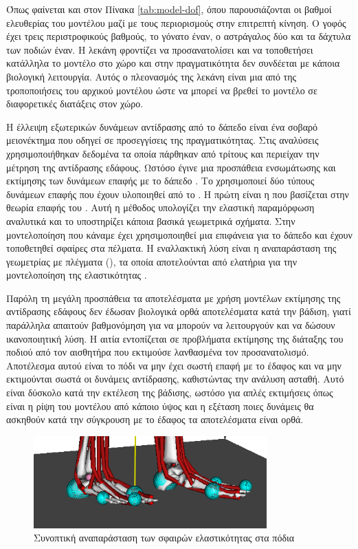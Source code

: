Όπως φαίνεται και στον Πίνακα \ref{tab:model-dof}, όπου παρουσιάζονται οι βαθμοί ελευθερίας του μοντέλου μαζί με τους περιορισμούς στην επιτρεπτή κίνηση. Ο γοφός έχει τρεις περιστροφικούς βαθμούς, το γόνατο έναν, ο αστράγαλος δύο και τα δάχτυλα των ποδιών έναν. Η λεκάνη φροντίζει να προσανατολίσει και να τοποθετήσει κατάλληλα το μοντέλο στο χώρο και στην πραγματικότητα δεν συνδέεται με κάποια βιολογική λειτουργία. Αυτός ο πλεονασμός της λεκάνη είναι μια από της τροποποιήσεις του αρχικού μοντέλου ώστε να μπορεί να βρεθεί το μοντέλο σε διαφορετικές διατάξεις στον χώρο.

Η έλλειψη εξωτερικών δυνάμεων αντίδρασης από το δάπεδο είναι ένα σοβαρό μειονέκτημα που οδηγεί σε προσεγγίσεις της πραγματικότητας. Στις αναλύσεις χρησιμοποιήθηκαν δεδομένα τα οποία πάρθηκαν από τρίτους και περιείχαν την μέτρηση της αντίδρασης εδάφους. Ωστόσο έγινε μια προσπάθεια ενσωμάτωσης και εκτίμησης των δυνάμεων επαφής με το δάπεδο \cite{seitha11}. Το  χρησιμοποιεί δύο τύπους δυνάμεων επαφής που έχουν υλοποιηθεί από το . Η πρώτη είναι η  που βασίζεται στην θεωρία επαφής του  \cite{hunt75}. Αυτή η μέθοδος υπολογίζει την ελαστική παραμόρφωση αναλυτικά και το  υποστηρίζει κάποια βασικά γεωμετρικά σχήματα. Στην μοντελοποίηση που κάναμε έχει χρησιμοποιηθεί μια επιφάνεια για το δάπεδο και έχουν τοποθετηθεί σφαίρες στα πέλματα. Η εναλλακτική λύση είναι η αναπαράσταση της γεωμετρίας με πλέγματα (), τα οποία αποτελούνται από ελατήρια για την μοντελοποίηση της ελαστικότητας \cite{hertz82}.

Παρόλη τη μεγάλη προσπάθεια τα αποτελέσματα με χρήση μοντέλων εκτίμησης της αντίδρασης εδάφους δεν έδωσαν βιολογικά ορθά αποτελέσματα κατά την βάδιση, γιατί παράλληλα απαιτούν βαθμονόμηση για να μπορούν να λειτουργούν και να δώσουν ικανοποιητική λύση. Η αιτία εντοπίζεται σε προβλήματα εκτίμησης της διάταξης του ποδιού από τον αισθητήρα που εκτιμούσε λανθασμένα τον προσανατολισμό. Αποτέλεσμα αυτού είναι το πόδι να μην έχει σωστή επαφή με το έδαφος και να μην εκτιμούνται σωστά οι δυνάμεις αντίδρασης, καθιστώντας την ανάλυση ασταθή. Αυτό είναι δύσκολο κατά την εκτέλεση της βάδισης, ωστόσο για απλές εκτιμήσεις όπως είναι η ρίψη του μοντέλου από κάποιο ύψος και η εξέταση ποιες δυνάμεις θα ασκηθούν κατά την σύγκρουση με το έδαφος τα αποτελέσματα είναι ορθά.

\begin{figure}[H]
    \centering
    \includegraphics[width=0.8\textwidth, keepaspectratio]{fig/foot-contact.png}
    \caption{Συνοπτική αναπαράσταση των σφαιρών ελαστικότητας στα πόδια}
    \label{fig:foot-contact}
\end{figure}

